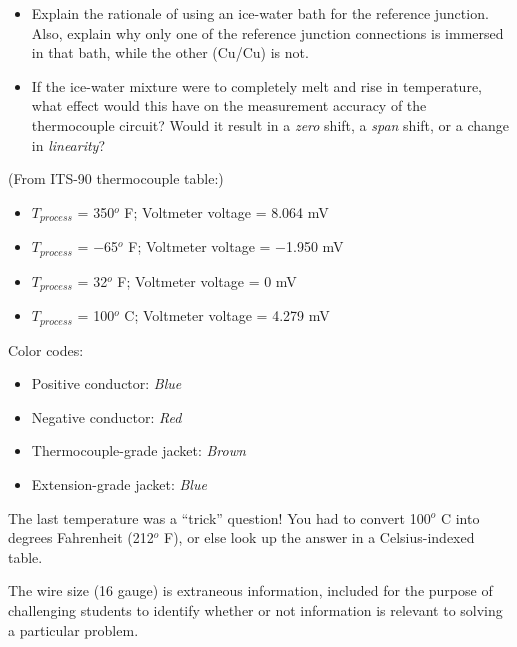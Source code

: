 \begin{itemize}
\item{} Explain the rationale of using an ice-water bath for the reference junction.  Also, explain why only one of the reference junction connections is immersed in that bath, while the other (Cu/Cu) is not.
\item{} If the ice-water mixture were to completely melt and rise in temperature, what effect would this have on the measurement accuracy of the thermocouple circuit?  Would it result in a {\it zero} shift, a {\it span} shift, or a change in {\it linearity}?
\end{itemize}







(From ITS-90 thermocouple table:)

\begin{itemize}
\item{} $T_{process}$ = 350$^{o}$ F; Voltmeter voltage = 8.064 mV 
\item{} $T_{process}$ = $-$65$^{o}$ F; Voltmeter voltage = $-$1.950 mV 
\item{} $T_{process}$ = 32$^{o}$ F; Voltmeter voltage = 0 mV 
\item{} $T_{process}$ = 100$^{o}$ C; Voltmeter voltage = 4.279 mV 
\end{itemize}

\vskip 10pt


Color codes:

\begin{itemize}
\item{} Positive conductor: {\it Blue}
\item{} Negative conductor: {\it Red}
\item{} Thermocouple-grade jacket: {\it Brown}
\item{} Extension-grade jacket: {\it Blue}
\end{itemize}

The last temperature was a ``trick'' question!  You had to convert 100$^{o}$ C into degrees Fahrenheit (212$^{o}$ F), or else look up the answer in a Celsius-indexed table.

\vskip 10pt

The wire size (16 gauge) is extraneous information, included for the purpose of challenging students to identify whether or not information is relevant to solving a particular problem.











